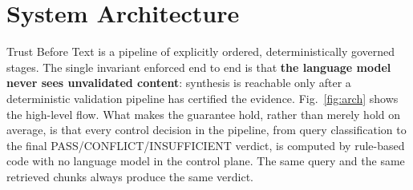 \documentclass[conference]{IEEEtran}
\begin{document}
\section{System Architecture}
\label{sec:arch}

Trust Before Text is a pipeline of explicitly ordered, deterministically
governed stages. The single invariant enforced end to end is that
\textbf{the language model never sees unvalidated content}: synthesis is
reachable only after a deterministic validation pipeline has certified the
evidence. Fig.~\ref{fig:arch} shows the high-level flow. What makes the
guarantee hold, rather than merely hold on average, is that every control
decision in the pipeline, from query classification to the final
PASS/CONFLICT/INSUFFICIENT verdict, is computed by rule-based code with no
language model in the control plane. The same query and the same retrieved
chunks always produce the same verdict.
\end{document}

